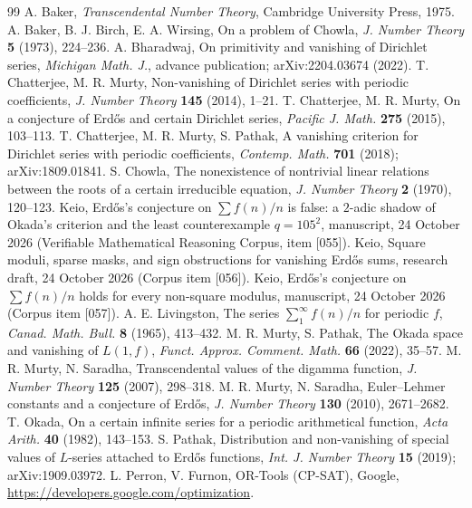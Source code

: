 \documentclass[11pt,a4paper]{article}
\theoremstyle{definition}
\theoremstyle{remark}
\begin{document}
\begin{thebibliography}{99}
 A. Baker, \emph{Transcendental Number Theory}, Cambridge University Press, 1975.
 A. Baker, B. J. Birch, E. A. Wirsing, On a problem of Chowla, \emph{J. Number Theory} \textbf{5} (1973), 224--236.
 A. Bharadwaj, On primitivity and vanishing of Dirichlet series, \emph{Michigan Math. J.}, advance publication; arXiv:2204.03674 (2022).
 T. Chatterjee, M. R. Murty, Non-vanishing of Dirichlet series with periodic coefficients, \emph{J. Number Theory} \textbf{145} (2014), 1--21.
 T. Chatterjee, M. R. Murty, On a conjecture of Erd\H{o}s and certain Dirichlet series, \emph{Pacific J. Math.} \textbf{275} (2015), 103--113.
 T. Chatterjee, M. R. Murty, S. Pathak, A vanishing criterion for Dirichlet series with periodic coefficients, \emph{Contemp. Math.} \textbf{701} (2018); arXiv:1809.01841.
 S. Chowla, The nonexistence of nontrivial linear relations between the roots of a certain irreducible equation, \emph{J. Number Theory} \textbf{2} (1970), 120--123.
 Keio, Erd\H{o}s's conjecture on $\sum f(n)/n$ is false: a $2$-adic shadow of Okada's criterion and the least counterexample $q=105^2$, manuscript, 24 October 2026 (Verifiable Mathematical Reasoning Corpus, item [055]).
 Keio, Square moduli, sparse masks, and sign obstructions for vanishing Erd\H{o}s sums, research draft, 24 October 2026 (Corpus item [056]).
 Keio, Erd\H{o}s's conjecture on $\sum f(n)/n$ holds for every non-square modulus, manuscript, 24 October 2026 (Corpus item [057]).
 A. E. Livingston, The series $\sum_1^\infty f(n)/n$ for periodic $f$, \emph{Canad. Math. Bull.} \textbf{8} (1965), 413--432.
 M. R. Murty, S. Pathak, The Okada space and vanishing of $L(1,f)$, \emph{Funct. Approx. Comment. Math.} \textbf{66} (2022), 35--57.
 M. R. Murty, N. Saradha, Transcendental values of the digamma function, \emph{J. Number Theory} \textbf{125} (2007), 298--318.
 M. R. Murty, N. Saradha, Euler--Lehmer constants and a conjecture of Erd\H{o}s, \emph{J. Number Theory} \textbf{130} (2010), 2671--2682.
 T. Okada, On a certain infinite series for a periodic arithmetical function, \emph{Acta Arith.} \textbf{40} (1982), 143--153.
 S. Pathak, Distribution and non-vanishing of special values of $L$-series attached to Erd\H{o}s functions, \emph{Int. J. Number Theory} \textbf{15} (2019); arXiv:1909.03972.
 L. Perron, V. Furnon, OR-Tools (CP-SAT), Google, \url{https://developers.google.com/optimization}.
\end{thebibliography}
\end{document}
